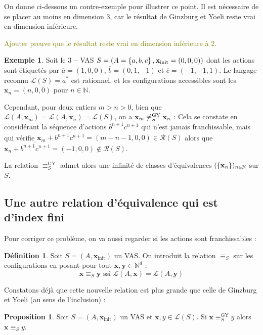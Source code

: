 \documentclass[a4paper,final]{article}
\theoremstyle{definition}
\newtheorem{Definition}[Theorem]{Définition}
\newtheorem{Proposition}[Theorem]{Proposition}
\newtheorem{Example}[Theorem]{Exemple}
\newcommand{\lucas}[1]{\textcolor{olive}{#1}}
\newcommand{\os}[1]{\left\{\mathinner{#1}\right\}}
\newcommand{\N}{\ensuremath{\mathbb{N}}}
\newcommand{\lang}{\ensuremath{\mathcal{L}}}
\newcommand{\reach}{\ensuremath{\mathcal{R}}}
\newcommand{\vect}[1]{\ensuremath{\mathbf{#1}}}
\newcommand{\rel}{\ensuremath{\equiv}}
\newcommand{\relGY}{\ensuremath{\equiv^\text{GY}_S}}
\newcommand{\ssi}{\ensuremath{\text{ ssi }}}
\newcommand{\xinit}{\ensuremath{\vect{x}_\text{init}}}
\newcommand{\valeur}[1]{\ensuremath{\overline{#1}}}
\begin{document}
\vspace{5mm}

On donne ci-dessous un contre-exemple pour illustrer ce point.
Il est nécessaire de se placer au moins en dimension 3, car le résultat de Ginzburg et Yoeli reste vrai en dimension inférieure.

\lucas{Ajouter preuve que le résultat reste vrai en dimension inférieure à 2.}

\begin{Example}
Soit le $3-$VAS $S = (A=\os{a,b,c}, \xinit=(0,0,0))$ dont les actions sont étiquetés par $\valeur{a}=(1,0,0)$, $\valeur{b}=(0,1,-1)$ et $\valeur{c}=(-1,-1,1)$.
Le langage reconnu $\lang(S)=a^\ast$ est rationnel, et les configurations accessibles sont les $\vect{x}_n=(n,0,0)$ pour $n\in\N$.

Cependant, pour deux entiers $m>n>0$, bien que $\lang(A,\vect{x}_m) =\lang(A,\vect{x}_n) =\lang(S)$, on a $\vect{x}_m \not\relGY \vect{x}_n$ :
Cela se constate en considérant la séquence d'actions $b^{n+1}c^{n+1}$ qui n'est jamais franchissable, mais qui vérifie $\vect{x}_m +\valeur{b^{n+1}c^{n+1}} = (m-n-1,0,0)\in \reach(S)$ alors que $\vect{x}_n +\valeur{b^{n+1}c^{n+1}} = (-1,0,0)\notin \reach(S)$.

La relation $\relGY$ admet alors une infinité de classes d'équivalences $(\os{\vect{x}_n})_{n\in\N}$ sur $S$.
\end{Example}


\subsection{Une autre relation d'équivalence qui est d'index fini}
Pour corriger ce problème, on va aussi regarder si les actions sont franchissables :

\begin{Definition}
Soit $S=(A,\xinit)$ un VAS. On introduit la relation $\rel_S$ sur les configurations en posant pour tout $\vect{x},\vect{y} \in\N^d$ :
$$\vect{x} \rel_S \vect{y} \ssi \lang(A,\vect{x}) = \lang(A,\vect{y})$$
\end{Definition}


Constatons déjà que cette nouvelle relation est plus grande que celle de Ginzburg et Yoeli (au sens de l'inclusion) :

\begin{Proposition}
Soit $S=(A,\xinit)$ un VAS et $\vect{x},y \in\lang(S)$.
Si $\vect{x} \relGY y$ alors $\vect{x} \rel_S y$.
\end{Proposition}
\end{document}

